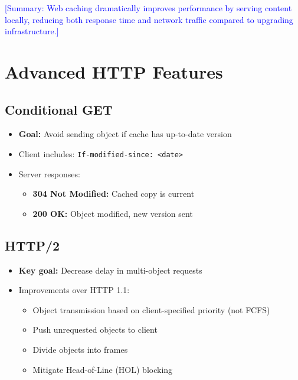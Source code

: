 \documentclass[12pt]{article}
\begin{document}
\textcolor{blue}{[Summary: Web caching dramatically improves performance by serving content locally, reducing both response time and network traffic compared to upgrading infrastructure.]}

\section{Advanced HTTP Features}

\subsection{Conditional GET}
\begin{itemize}
    \item \textbf{Goal:} Avoid sending object if cache has up-to-date version
    \item Client includes: \texttt{If-modified-since: <date>}
    \item Server responses:
          \begin{itemize}
              \item \textbf{304 Not Modified:} Cached copy is current
              \item \textbf{200 OK:} Object modified, new version sent
          \end{itemize}
\end{itemize}

\subsection{HTTP/2}
\begin{itemize}
    \item \textbf{Key goal:} Decrease delay in multi-object requests
    \item Improvements over HTTP 1.1:
          \begin{itemize}
              \item Object transmission based on client-specified priority (not FCFS)
              \item Push unrequested objects to client
              \item Divide objects into frames
              \item Mitigate Head-of-Line (HOL) blocking
          \end{itemize}
\end{itemize}
\end{document}
